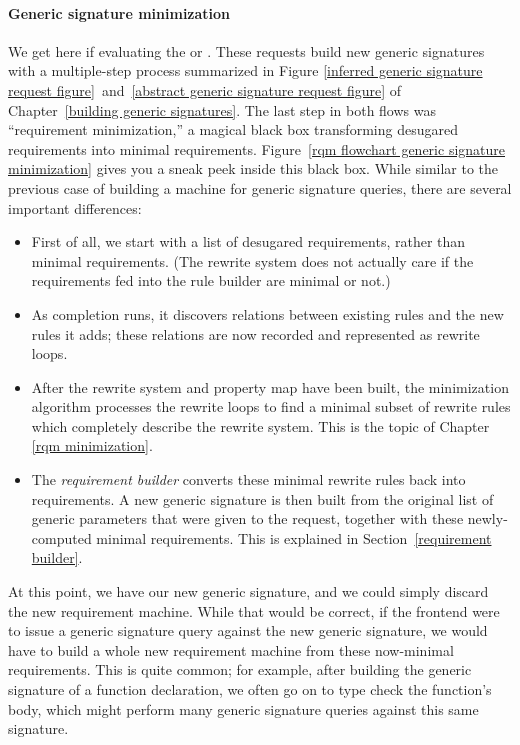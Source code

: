 \documentclass[../generics]{subfiles}
\begin{document}
\paragraph{Generic signature minimization}
%
%
%
%
We get here if evaluating the  or . These requests build new generic signatures with a multiple-step process summarized in Figure \ref{inferred generic signature request figure}~and~\ref{abstract generic signature request figure} of Chapter~\ref{building generic signatures}. The last step in both flows was ``requirement minimization,'' a magical black box transforming desugared requirements into minimal requirements. Figure~\ref{rqm flowchart generic signature minimization} gives you a sneak peek inside this black box. While similar to the previous case of building a machine for generic signature queries, there are several important differences:
\begin{itemize}
\item First of all, we start with a list of desugared requirements, rather than minimal requirements. (The rewrite system does not actually care if the requirements fed into the rule builder are minimal or not.)
\item As completion runs, it discovers relations between existing rules and the new rules it adds; these relations are now recorded and represented as rewrite loops.
\item After the rewrite system and property map have been built, the minimization algorithm processes the rewrite loops to find a minimal subset of rewrite rules which completely describe the rewrite system. This is the topic of Chapter \ref{rqm minimization}.
%
\item The \emph{requirement builder} converts these minimal rewrite rules back into requirements. A new generic signature is then built from the original list of generic parameters that were given to the request, together with these newly-computed minimal requirements. This is explained in Section~\ref{requirement builder}.
\end{itemize}

At this point, we have our new generic signature, and we could simply discard the new requirement machine. While that would be correct, if the frontend were to issue a generic signature query against the new generic signature, we would have to build a whole new requirement machine from these now-minimal requirements. This is quite common; for example, after building the generic signature of a function declaration, we often go on to type check the function's body, which might perform many generic signature queries against this same signature.
\end{document}
